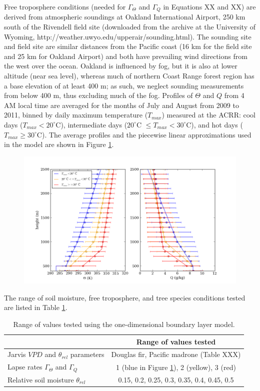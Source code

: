 Free troposphere conditions (needed for $\Gamma_{\Theta}$ and $\Gamma_Q$ in Equations XX and XX) are derived from atmospheric soundings at Oakland International Airport, 250 km south of the Rivendell field site (downloaded from the archive at the University of Wyoming, http://weather.uwyo.edu/upperair/sounding.html).  The sounding site and field site are similar distances from the Pacific coast (16 km for the field site and 25 km for Oakland Airport) and both have prevailing wind directions from the west over the ocean.  Oakland is influenced by fog, but it is also at lower altitude (near sea level), whereas much of northern Coast Range forest region has a base elevation of at least 400 m; as such, we neglect sounding measurements from below 400 m, thus excluding much of the fog.  Profiles of $\Theta$ and $Q$ from 4 AM local time are averaged for the months of July and August from 2009 to 2011, binned by daily maximum temperature ($T_{max}$) measured at the ACRR: cool days ($T_{max} < 20^{\circ}$C), intermediate days ($20^{\circ}$C $\le T_{max} < 30^{\circ}$C), and hot days ($T_{max} \ge 30^{\circ}$C).  The average profiles and the piecewise linear approximations used in the model are shown in Figure \ref{fig:BL_LapseRates}.

\begin{figure}[here]
\includegraphics[width=1\textwidth]{ch2-BL/figures/fitted_lapserates_theta_Q_onefig.png}
\caption{}
\label{fig:BL_LapseRates}
\end{figure}

The range of soil moisture, free troposphere, and tree species conditions tested are listed in Table \ref{table:BL_1Druns}.  

\begin{table}
\begin{tabular}{ l c }
\hline
 & Range of values tested \\ \hline
Jarvis $VPD$ and $\theta_{rel}$ parameters & Douglas fir, Pacific madrone (Table XXX)\\
Lapse rates $\Gamma_{\Theta}$ and $\Gamma_Q$ & 1 (blue in Figure \ref{fig:BL_LapseRates}), 2 (yellow), 3 (red)\\
Relative soil moisture $\theta_{rel}$ & 0.15, 0.2, 0.25, 0.3, 0.35, 0.4, 0.45, 0.5\\
\hline
\end{tabular}
\caption{Range of values tested using the one-dimensional boundary layer model.}
\label{table:BL_1Druns}
\end{table}

